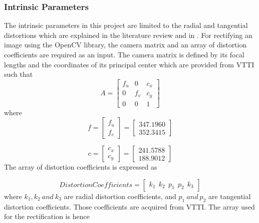 \subsubsection{Intrinsic Parameters}
The intrinsic parameters in this project are limited to the radial and tangential distortions which are explained in the literature review and in \cite{wang2008new}. For rectifying an image using the OpenCV library, the camera matrix and an array of distortion coefficients are required as an input. The camera matrix is defined by its focal lengths and the coordinates of its principal center which are provided from VTTI such that
\begin{equation}
    A = 
     \begin{bmatrix}
    f_u & 0 & c_x\\
    0 & f_v & c_y\\
    0 & 0 & 1
    \end{bmatrix}
\end{equation}
where
\begin{equation}
    f = 
     \begin{bmatrix}
    f_u \\ f_v
    \end{bmatrix}
    =
    \begin{bmatrix}
    347.1960 \\ 352.3415
    \end{bmatrix}
\end{equation}

\begin{equation}
    c = 
    \begin{bmatrix}
    c_x \\ c_y
    \end{bmatrix}
    =
    \begin{bmatrix}
    241.5788 \\ 188.9012
    \end{bmatrix}
\end{equation}
The array of distortion coefficients is expressed as

\begin{equation}
    DistortionCoefficients = 
    \begin{bmatrix}
    k_1 ~~ k_2 ~~ p_1 ~~ p_2 ~~ k_3
    \end{bmatrix}
\end{equation}
where $k_1,k_2 ~ and ~ k_3$ are radial distortion coefficients, and $p_1~and~p_2$ are tangential distortion coefficients. Those coefficients are acquired from VTTI. The array used for the rectification is hence


